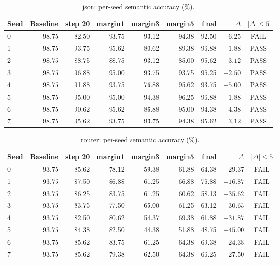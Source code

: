 \begin{table}[H]
\centering
\caption{json: per-seed semantic accuracy (\%).}
\small
\begin{tabular}{@{}lrrrrrrrc@{}}
\toprule
Seed & Baseline & step 20 & margin1 & margin3 & margin5 & final & $\Delta$ & $|\Delta| \le 5$\\
\midrule
0 & 98.75 & 82.50 & 93.75 & 93.12 & 94.38 & 92.50 & $-6.25$ & FAIL\\
1 & 98.75 & 93.75 & 95.62 & 80.62 & 89.38 & 96.88 & $-1.88$ & PASS\\
2 & 98.75 & 88.75 & 88.75 & 93.12 & 85.00 & 95.62 & $-3.12$ & PASS\\
3 & 98.75 & 96.88 & 95.00 & 93.75 & 93.75 & 96.25 & $-2.50$ & PASS\\
4 & 98.75 & 91.88 & 93.75 & 76.88 & 95.62 & 93.75 & $-5.00$ & PASS\\
5 & 98.75 & 95.00 & 95.00 & 94.38 & 96.25 & 96.88 & $-1.88$ & PASS\\
6 & 98.75 & 90.62 & 95.62 & 86.88 & 95.00 & 94.38 & $-4.38$ & PASS\\
7 & 98.75 & 95.62 & 93.75 & 93.75 & 94.38 & 95.62 & $-3.12$ & PASS\\
\bottomrule
\end{tabular}
\end{table}

\begin{table}[H]
\centering
\caption{router: per-seed semantic accuracy (\%).}
\small
\begin{tabular}{@{}lrrrrrrrc@{}}
\toprule
Seed & Baseline & step 20 & margin1 & margin3 & margin5 & final & $\Delta$ & $|\Delta| \le 5$\\
\midrule
0 & 93.75 & 85.62 & 78.12 & 59.38 & 61.88 & 64.38 & $-29.37$ & FAIL\\
1 & 93.75 & 87.50 & 86.88 & 61.25 & 66.88 & 76.88 & $-16.87$ & FAIL\\
2 & 93.75 & 86.25 & 83.75 & 61.25 & 60.62 & 58.13 & $-35.62$ & FAIL\\
3 & 93.75 & 83.75 & 77.50 & 65.00 & 61.25 & 63.12 & $-30.63$ & FAIL\\
4 & 93.75 & 82.50 & 80.62 & 54.37 & 69.38 & 61.88 & $-31.87$ & FAIL\\
5 & 93.75 & 84.38 & 82.50 & 44.38 & 51.88 & 48.75 & $-45.00$ & FAIL\\
6 & 93.75 & 85.62 & 83.75 & 61.25 & 64.38 & 69.38 & $-24.38$ & FAIL\\
7 & 93.75 & 85.62 & 79.38 & 62.50 & 64.38 & 66.25 & $-27.50$ & FAIL\\
\bottomrule
\end{tabular}
\end{table}

